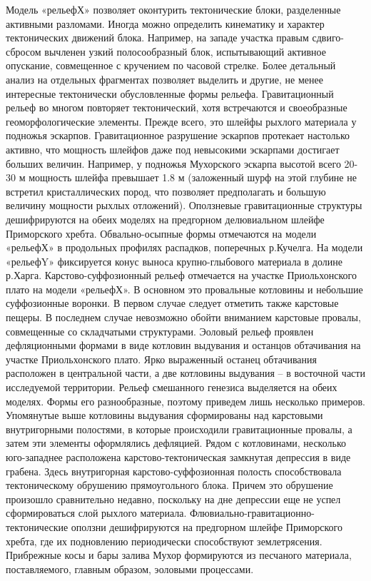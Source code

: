 \documentclass[runningheads]{AIIT}
\begin{document}
Модель «рельефХ» позволяет оконтурить тектонические блоки, разделенные активными разломами. Иногда можно определить кинематику и характер тектонических движений блока. Например, на западе участка правым сдвиго-сбросом вычленен узкий полосообразный блок, испытывающий активное опускание, совмещенное с кручением по часовой стрелке.
Более детальный анализ на отдельных фрагментах позволяет выделить и другие, не менее интересные тектонически обусловленные формы рельефа.
Гравитационный рельеф во многом повторяет тектонический, хотя встречаются и своеобразные геоморфологические элементы. Прежде всего, это шлейфы рыхлого материала у подножья эскарпов. Гравитационное разрушение эскарпов протекает настолько активно, что мощность шлейфов даже под невысокими эскарпами достигает больших величин. Например, у подножья Мухорского эскарпа высотой всего 20-30 м мощность шлейфа превышает 1.8 м (заложенный шурф на этой глубине не встретил кристаллических пород, что позволяет предполагать и большую величину мощности рыхлых отложений). Оползневые гравитационные структуры дешифрируются на обеих моделях на предгорном делювиальном шлейфе Приморского хребта. Обвально-осыпные формы отмечаются на модели «рельефХ» в продольных профилях распадков, поперечных р.Кучелга. На модели «рельефY» фиксируется конус выноса крупно-глыбового материала в долине р.Харга.
Карстово-суффозионный рельеф отмечается на участке Приольхонского плато на модели «рельефХ». В основном это провальные котловины и небольшие суффозионные воронки. В первом случае следует отметить также карстовые пещеры. В последнем случае невозможно обойти вниманием карстовые провалы, совмещенные со складчатыми структурами.
Эоловый рельеф проявлен дефляционными формами в виде котловин выдувания и останцов обтачивания на участке Приольхонского плато. Ярко выраженный останец обтачивания расположен в центральной части, а две котловины выдувания – в восточной части исследуемой территории.
Рельеф смешанного генезиса выделяется на обеих моделях. Формы его разнообразные, поэтому приведем лишь несколько примеров. Упомянутые выше котловины выдувания сформированы над карстовыми внутригорными полостями, в которые происходили гравитационные провалы, а затем эти элементы оформлялись дефляцией. Рядом с котловинами, несколько юго-западнее расположена карстово-тектоническая замкнутая депрессия в виде грабена. Здесь внутригорная карстово-суффозионная полость способствовала тектоническому обрушению прямоугольного блока. Причем это обрушение произошло сравнительно недавно, поскольку на дне депрессии еще не успел сформироваться слой рыхлого материала. Флювиально-гравитационно-тектонические оползни дешифрируются на предгорном шлейфе Приморского хребта, где их подновлению периодически способствуют землетрясения. Прибрежные косы и бары залива Мухор формируются из песчаного материала, поставляемого, главным образом, эоловыми процессами.
\end{document}
